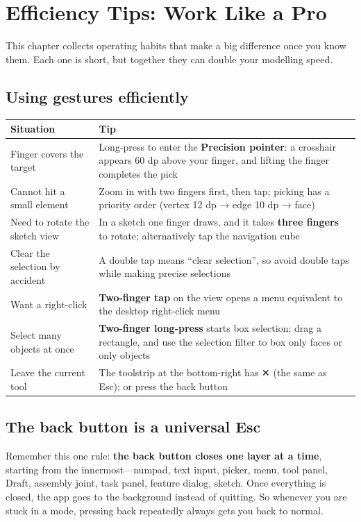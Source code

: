 \chapter{Efficiency Tips: Work Like a Pro}

This chapter collects operating habits that make a big difference once you know them. Each one is short,
but together they can double your modelling speed.

\section{Using gestures efficiently}

\begin{center}
\small
\begin{tabularx}{\linewidth}{@{}lX@{}}
\toprule
\textbf{Situation} & \textbf{Tip} \\
\midrule
Finger covers the target & Long-press to enter the \textbf{Precision pointer}: a crosshair appears 60 dp above your finger, and lifting the finger completes the pick \\
Cannot hit a small element & Zoom in with two fingers first, then tap; picking has a priority order (vertex 12 dp → edge 10 dp → face) \\
Need to rotate the sketch view & In a sketch one finger draws, and it takes \textbf{three fingers} to rotate; alternatively tap the navigation cube \\
Clear the selection by accident & A double tap means ``clear selection'', so avoid double taps while making precise selections \\
Want a right-click & \textbf{Two-finger tap} on the view opens a menu equivalent to the desktop right-click menu \\
Select many objects at once & \textbf{Two-finger long-press} starts box selection; drag a rectangle, and use the selection filter to box only faces or only objects \\
Leave the current tool & The toolstrip at the bottom-right has ✕ (the same as Esc); or press the back button \\
\bottomrule
\end{tabularx}
\end{center}

\section{The back button is a universal Esc}

Remember this one rule: \textbf{the back button closes one layer at a time}, starting from the innermost---numpad,
text input, picker, menu, tool panel, Draft, assembly joint, task panel, feature dialog, sketch. Once everything
is closed, the app goes to the background instead of quitting. So whenever you are stuck in a mode, pressing back
repeatedly always gets you back to normal.

